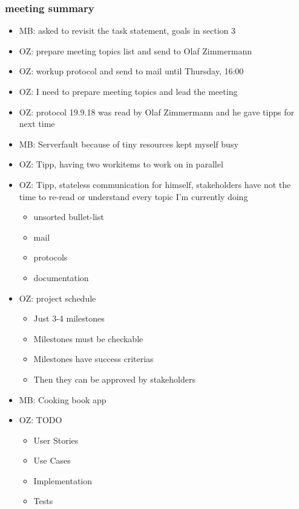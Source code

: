 \subsubsection{meeting summary}
\begin{itemize}
    \item MB: asked to revisit the task statement, goals in section 3
    \item OZ: prepare meeting topics list and send to Olaf Zimmermann
    \item OZ: workup protocol and send to mail until Thursday, 16:00
    \item OZ: I need to prepare meeting topics and lead the meeting
    \item OZ: protocol 19.9.18 was read by Olaf Zimmermann and he gave tipps for next time
    \item MB: Serverfault because of tiny resources kept myself busy
    \item OZ: Tipp, having two workitems to work on in parallel
    \item OZ: Tipp, stateless communication for himself, stakeholders have not the time to re-read or understand every topic I'm currently doing
        \begin{itemize}
            \item unsorted bullet-list
            \item mail
            \item protocols
            \item documentation
        \end{itemize}   
    \item OZ: project schedule
        \begin{itemize}
            \item Just 3-4 milestones
            \item Milestones must be checkable
            \item Milestones have success criterias
            \item Then they can be approved by stakeholders
        \end{itemize}
    \item MB: Cooking book app
    \item OZ: TODO
        \begin{itemize}
            \item User Stories
            \item Use Cases
            \item Implementation
            \item Tests

\end{itemize}
\end{itemize}
